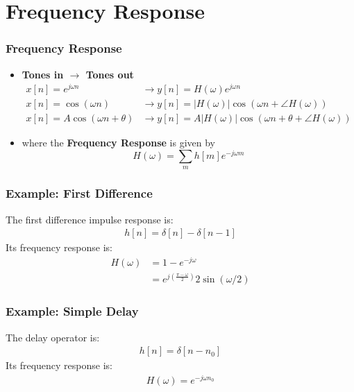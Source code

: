 \documentclass{beamer}
\begin{document}
\section[Freq.~Response]{Frequency Response}
\setcounter{subsection}{1}


\begin{frame}
  \frametitle{Frequency Response}
  \begin{itemize}
  \item {\bf Tones in $\rightarrow$ Tones out}
    \begin{align*}
      x[n]=e^{j\omega n} &\rightarrow y[n]=H(\omega)e^{j\omega n}\\
      x[n]=\cos\left(\omega n\right)
      &\rightarrow y[n]=|H(\omega)|\cos\left(\omega n+\angle H(\omega)\right)\\
      x[n]=A\cos\left(\omega n+\theta\right)
      &\rightarrow y[n]=A|H(\omega)|\cos\left(\omega n+\theta+\angle H(\omega)\right)
    \end{align*}
  \item where the {\bf Frequency Response} is given by
    \[
    H(\omega) = \sum_m h[m]e^{-j\omega m}
    \]
  \end{itemize}
\end{frame}  
        
\begin{frame}
  \frametitle{Example: First Difference}

  The first difference impulse response is:
  \begin{align*}
    h[n] = \delta[n]-\delta[n-1]
  \end{align*}
  Its frequency response is:
  \begin{align*}
    H(\omega) &= 1-e^{-j\omega}\\
    &= e^{j\left(\frac{\pi-\omega}{2}\right)} 2\sin(\omega/2)
  \end{align*}
\end{frame}
  
\begin{frame}
  \frametitle{Example: Simple Delay}

  The delay operator is:
  \begin{align*}
    h[n] = \delta[n-n_0]
  \end{align*}
  Its frequency response is:
  \begin{align*}
    H(\omega) = e^{-j\omega n_0}
  \end{align*}
\end{frame}
  
\end{document}
